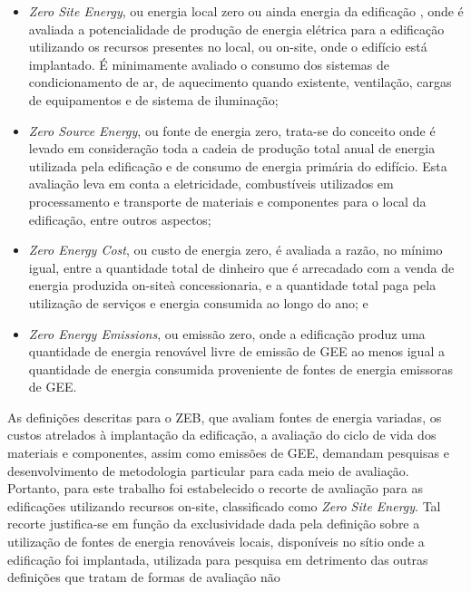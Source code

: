 \begin{itemize}
    \item \textit{Zero Site Energy}, ou energia local zero ou ainda energia da 
    edificação \cite{U.S.DepartmentofEnergy-USDOE2015}, onde é avaliada a 
    potencialidade de produção de energia elétrica para a  edificação  
    utilizando  os  recursos  presentes  no  local,  ou on-site,  onde  o  
    edifício  está implantado. É minimamente avaliado o consumo dos 
    sistemas de condicionamento de ar, de aquecimento quando existente, 
    ventilação, cargas de equipamentos e de sistema de iluminação;
    \item \textit{Zero Source Energy},  ou  fonte  de  energia  zero,  trata-se  do  
    conceito  onde  é  levado  em consideração toda a cadeia de produção 
    total anual de energia utilizada pela edificação e de consumo de 
    energia primária do edifício. Esta avaliação leva em conta a 
    eletricidade, combustíveis utilizados em processamento e transporte de 
    materiais e componentes para o local da edificação, entre outros aspectos;
    \item \textit{Zero Energy Cost}, ou custo de energia zero, é avaliada a razão, 
    no mínimo igual, entre a quantidade total de dinheiro que é arrecadado 
    com a venda de energia produzida on-siteà  concessionaria,  e  a  
    quantidade  total  paga  pela  utilização  de  serviços  e  energia 
    consumida ao longo do ano; e 
    \item \textit{Zero Energy Emissions},  ou  emissão  zero,  onde  a  edificação  
    produz  uma  quantidade  de energia  renovável  livre  de  emissão  
    de  GEE  ao  menos  igual  a  quantidade  de  energia consumida 
    proveniente de fontes de energia emissoras de GEE. 
\end{itemize}
As definições descritas para o ZEB, que avaliam fontes de energia variadas, 
os custos atrelados à implantação da edificação, a avaliação do ciclo de vida 
dos materiais e componentes, assim como emissões de GEE, demandam pesquisas e 
desenvolvimento de metodologia particular para cada meio de avaliação. 
Portanto, para este trabalho foi estabelecido o recorte de avaliação para 
as edificações utilizando recursos on-site, classificado como \textit{Zero Site Energy}. 
Tal recorte justifica-se em função da exclusividade dada pela definição 
sobre a utilização de fontes de energia renováveis locais, 
disponíveis no sítio onde a edificação foi implantada, utilizada para pesquisa 
em detrimento das outras definições que tratam de formas de avaliação não 
